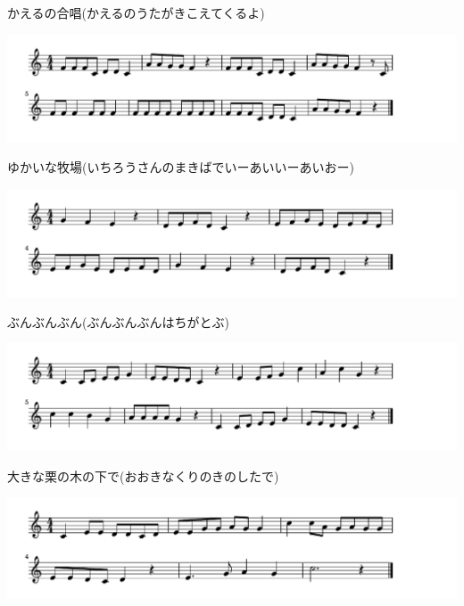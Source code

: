 \documentclass[a4paper]{ltjsarticle}
\begin{document}
\vspace{-10mm} \hspace{10mm}
かえるの合唱(かえるのうたがきこえてくるよ)

\includegraphics[clip]{yukainamakiba_crop.pdf}

\vspace{-10mm} \hspace{10mm}
ゆかいな牧場(いちろうさんのまきばでいーあいいーあいおー)

\includegraphics[clip]{bunbunbun_crop.pdf}

\vspace{-10mm} \hspace{10mm}
ぶんぶんぶん(ぶんぶんぶんはちがとぶ)

\includegraphics[clip]{okinakuri_crop.pdf}

\vspace{-10mm} \hspace{10mm}
大きな栗の木の下で(おおきなくりのきのしたで)

\includegraphics[clip]{tonbono_crop.pdf}
\end{document}
